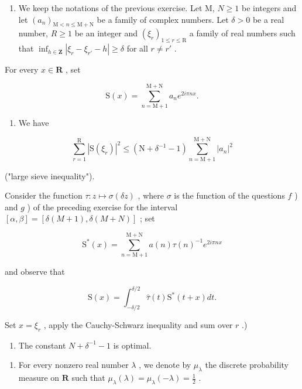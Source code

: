 \begin{enumerate}
\def\labelenumi{\arabic{enumi})}
\setcounter{enumi}{56}
\tightlist
\item
  We keep the notations of the previous exercise. Let M, \(N \geqslant 1\) be integers and let \((a_{n})_{\mathrm{M} < n \leqslant \mathrm{M} + \mathrm{N}}\) be a family of complex numbers. Let \(\delta > 0\) be a real number, \(R \geqslant 1\) be an integer and \((\xi_{r})_{1 \leqslant r \leqslant \mathrm{R}}\) a family of real numbers such that \(\inf_{h \in \mathbf{Z}} |\xi_{r} - \xi_{r'} - h| \geqslant \delta\) for all \(r \neq r'\) .
\end{enumerate}

For every \(x\in \mathbf{R}\) , set

\[
\mathrm{S} (x) = \sum_ {n = \mathrm{M} + 1} ^ {\mathrm{M} + \mathrm{N}} a _ {n} e ^ {2 i \pi n x}.
\]

\begin{enumerate}
\def\labelenumi{\alph{enumi})}
\tightlist
\item
  We have
\end{enumerate}

\[
\sum_ {r = 1} ^ {\mathrm{R}} | \mathrm{S} (\xi_ {r}) | ^ {2} \leqslant (\mathrm{N} + \delta^ {- 1} - 1) \sum_ {n = \mathrm{M} + 1} ^ {\mathrm{M} + \mathrm{N}} | a _ {n} | ^ {2}
\]

("large sieve inequality").

Consider the function \(\tau\colon z\mapsto\sigma(\delta z)\) , where \(\sigma\) is the function of the questions \(f\) ) and \(g\) ) of the preceding exercise for the interval \([\alpha,\beta]=[ \delta(M+1),\delta(M+N)]\) ; set

\[
\mathrm{S} ^ {*} (x) = \sum_ {n = \mathrm{M} + 1} ^ {\mathrm{M} + \mathrm{N}} a (n) \tau (n) ^ {- 1} e ^ {2 i \pi n x}
\]

and observe that

\[
\mathrm{S} (x) = \int_ {- \delta / 2} ^ {\delta / 2} \widehat {\tau} (t) \mathrm{S} ^ {*} (t + x) d t.
\]

Set \(x = \xi_r\) , apply the Cauchy-Schwarz inequality and sum over \(r\) .)

\begin{enumerate}
\def\labelenumi{\alph{enumi})}
\setcounter{enumi}{1}
\tightlist
\item
  The constant \(N + \delta^{-1} - 1\) is optimal.
\end{enumerate}

\begin{enumerate}
\def\labelenumi{\arabic{enumi})}
\setcounter{enumi}{57}
\tightlist
\item
  For every nonzero real number \(\lambda\) , we denote by \(\mu_{\lambda}\) the discrete probability measure on \(\mathbf{R}\) such that \(\mu_{\lambda}(\lambda) = \mu_{\lambda}(-\lambda) = \frac{1}{2}\) .
\end{enumerate}

